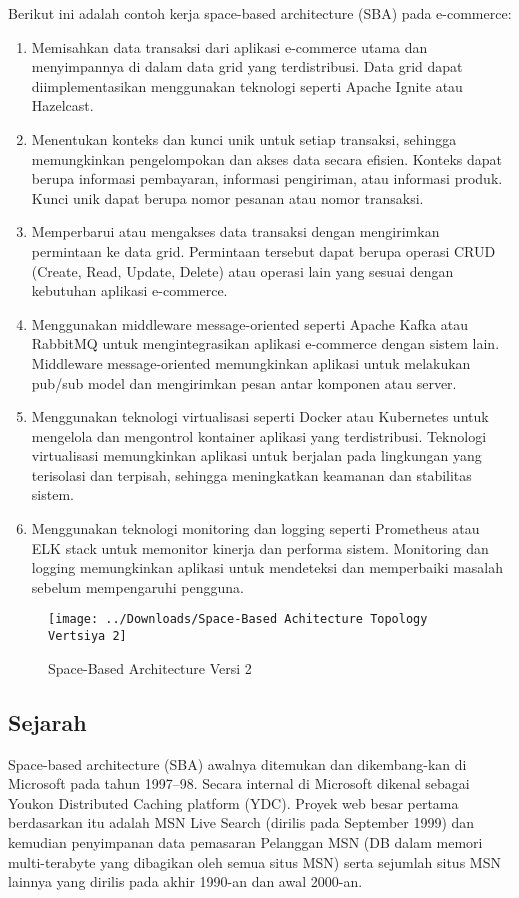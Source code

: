 \documentclass[a4paper]{report}
\begin{document}
	Berikut ini adalah contoh kerja space-based architecture (SBA) pada e-commerce:
	\begin{enumerate}
		\item \large Memisahkan data transaksi dari aplikasi e-commerce utama dan menyimpannya di dalam data grid yang terdistribusi. Data grid dapat diimplementasikan menggunakan teknologi seperti Apache Ignite atau Hazelcast.
		\item \large Menentukan konteks dan kunci unik untuk setiap transaksi, sehingga memungkinkan pengelompokan dan akses data secara efisien. Konteks dapat berupa informasi pembayaran, informasi pengiriman, atau informasi produk. Kunci unik dapat berupa nomor pesanan atau nomor transaksi.
		\item \large Memperbarui atau mengakses data transaksi dengan mengirimkan permintaan ke data grid. Permintaan tersebut dapat berupa operasi CRUD (Create, Read, Update, Delete) atau operasi lain yang sesuai dengan kebutuhan aplikasi e-commerce.
		\item \large Menggunakan middleware message-oriented seperti Apache Kafka atau RabbitMQ untuk mengintegrasikan aplikasi e-commerce dengan sistem lain. Middleware message-oriented memungkinkan aplikasi untuk melakukan pub/sub model dan mengirimkan pesan antar komponen atau server.
		\item \large Menggunakan teknologi virtualisasi seperti Docker atau Kubernetes untuk mengelola dan mengontrol kontainer aplikasi yang terdistribusi. Teknologi virtualisasi memungkinkan aplikasi untuk berjalan pada lingkungan yang terisolasi dan terpisah, sehingga meningkatkan keamanan dan stabilitas sistem.
		\item \large Menggunakan teknologi monitoring dan logging seperti Prometheus atau ELK stack untuk memonitor kinerja dan performa sistem. Monitoring dan logging memungkinkan aplikasi untuk mendeteksi dan memperbaiki masalah sebelum mempengaruhi pengguna.
	\end{enumerate}
	\begin{figure}
		\centering
		\texttt{[image: ../Downloads/Space-Based Achitecture Topology Vertsiya 2]}
		\caption{Space-Based Architecture Versi 2}
	\end{figure}
	\vskip0.5cm
	\subsection*{\LARGE{Sejarah}}
	\large Space-based architecture (SBA) awalnya ditemukan dan dikembang-kan di Microsoft pada tahun 1997–98. Secara internal di Microsoft dikenal sebagai Youkon Distributed Caching platform (YDC). Proyek web besar pertama berdasarkan itu adalah MSN Live Search (dirilis pada September 1999) dan kemudian penyimpanan data pemasaran Pelanggan MSN (DB dalam memori multi-terabyte yang dibagikan oleh semua situs MSN) serta sejumlah situs MSN lainnya yang dirilis pada akhir 1990-an dan awal 2000-an.
\end{document}
